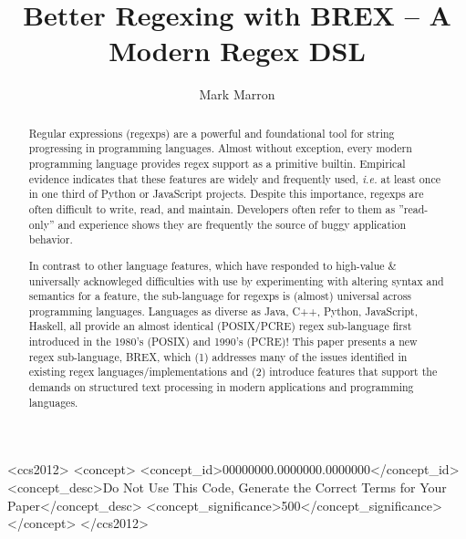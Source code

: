 \documentclass[sigplan,10pt,review,anonymous]{acmart}
\newcommand{\ie}{\hbox{\emph{i.e.}}\xspace}
\begin{document}
\title{Better Regexing with BREX -- A Modern Regex DSL}

\author{Mark Marron}

\begin{abstract}
Regular expressions (regexps) are a powerful and foundational tool for string progressing in programming languages. Almost without 
exception, every modern programming language provides regex support as a primitive builtin. Empirical evidence indicates that these 
features are widely and frequently used, \ie at least once in one third of Python or JavaScript projects. Despite this importance, 
regexps are often difficult to write, read, and maintain. Developers often refer to them as ''read-only'' and experience shows they 
are frequently the source of buggy application behavior. 

In contrast to other language features, which have responded to high-value \& universally acknowleged difficulties with use by experimenting 
with altering syntax and semantics for a feature, the sub-language for regexps is (almost) universal across programming languages. Languages 
as diverse as Java, C++, Python, JavaScript, Haskell, all provide an almost identical (POSIX/PCRE) regex sub-language first introduced in 
the 1980's (POSIX) and 1990's (PCRE)! This paper presents a new regex sub-language, BREX, which (1) addresses many of the issues identified 
in existing regex languages/implementations and (2) introduce features that support the demands on structured text processing in modern 
applications and programming languages.
\end{abstract}

\begin{CCSXML}
<ccs2012>
 <concept>
  <concept_id>00000000.0000000.0000000</concept_id>
  <concept_desc>Do Not Use This Code, Generate the Correct Terms for Your Paper</concept_desc>
  <concept_significance>500</concept_significance>
 </concept>
</ccs2012>
\end{CCSXML}

\end{document}
